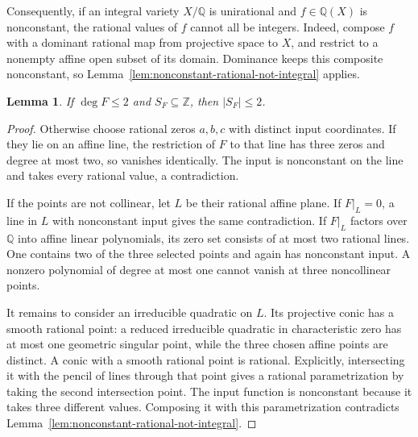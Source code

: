 \documentclass[11pt]{article}
\newtheorem{lemma}[theorem]{Lemma}
\theoremstyle{definition}
\theoremstyle{remark}
\newcommand{\Q}{\mathbb Q}
\newcommand{\Z}{\mathbb Z}
\begin{document}
Consequently, if an integral variety $X/\Q$ is unirational and
$f\in\Q(X)$ is nonconstant, the rational values of $f$ cannot all be
integers.  Indeed, compose $f$ with a dominant rational map from
projective space to $X$, and restrict to a nonempty affine open subset
of its domain.  Dominance keeps this composite nonconstant, so
Lemma~\ref{lem:nonconstant-rational-not-integral} applies.

\begin{lemma}\label{lem:quadratic-projection-finite}
If $\deg F\leq2$ and $S_F\subseteq\Z$, then $|S_F|\leq2$.
\end{lemma}
\begin{proof}
Otherwise choose rational zeros $a,b,c$ with distinct input
coordinates.  If they lie on an affine line, the restriction of $F$
to that line has three zeros and degree at most two, so vanishes
identically.  The input is nonconstant on the line and takes every
rational value, a contradiction.

If the points are not collinear, let $L$ be their rational affine
plane.  If $F|_L=0$, a line in $L$ with nonconstant input gives the same
contradiction.  If $F|_L$ factors over $\Q$ into affine linear
polynomials, its zero set consists of at most two rational lines.
One contains two of the three selected points and again has
nonconstant input.  A nonzero polynomial of degree at most one
cannot vanish at three noncollinear points.

It remains to consider an irreducible quadratic on $L$.  Its
projective conic has a smooth rational point: a reduced irreducible
quadratic in characteristic zero has at most one geometric singular
point, while the three chosen affine points are distinct.  A conic
with a smooth rational point is rational.  Explicitly, intersecting
it with the pencil of lines through that point gives a rational
parametrization by taking the second intersection point.  The input
function is nonconstant because it takes three different values.
Composing it with this parametrization contradicts
Lemma~\ref{lem:nonconstant-rational-not-integral}.
\end{proof}
\end{document}
